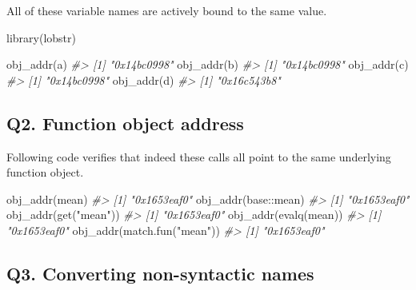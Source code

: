 \documentclass[
]{book}
\newenvironment{Shaded}{\begin{snugshade}}{\end{snugshade}}
\newcommand{\CommentTok}[1]{\textcolor[rgb]{0.56,0.35,0.01}{\textit{#1}}}
\newcommand{\FunctionTok}[1]{\textcolor[rgb]{0.00,0.00,0.00}{#1}}
\newcommand{\NormalTok}[1]{#1}
\newcommand{\SpecialCharTok}[1]{\textcolor[rgb]{0.00,0.00,0.00}{#1}}
\newcommand{\StringTok}[1]{\textcolor[rgb]{0.31,0.60,0.02}{#1}}
\begin{document}
All of these variable names are actively bound to the same value.

\begin{Shaded}
\begin{Highlighting}[]
\FunctionTok{library}\NormalTok{(lobstr)}

\FunctionTok{obj\_addr}\NormalTok{(a)}
\CommentTok{\#\textgreater{} [1] "0x14bc0998"}
\FunctionTok{obj\_addr}\NormalTok{(b)}
\CommentTok{\#\textgreater{} [1] "0x14bc0998"}
\FunctionTok{obj\_addr}\NormalTok{(c)}
\CommentTok{\#\textgreater{} [1] "0x14bc0998"}
\FunctionTok{obj\_addr}\NormalTok{(d)}
\CommentTok{\#\textgreater{} [1] "0x16c543b8"}
\end{Highlighting}
\end{Shaded}

\hypertarget{q2.-function-object-address}{%
\subsection*{Q2. Function object address}\label{q2.-function-object-address}}

Following code verifies that indeed these calls all point to the same underlying function object.

\begin{Shaded}
\begin{Highlighting}[]
\FunctionTok{obj\_addr}\NormalTok{(mean)}
\CommentTok{\#\textgreater{} [1] "0x1653eaf0"}
\FunctionTok{obj\_addr}\NormalTok{(base}\SpecialCharTok{::}\NormalTok{mean)}
\CommentTok{\#\textgreater{} [1] "0x1653eaf0"}
\FunctionTok{obj\_addr}\NormalTok{(}\FunctionTok{get}\NormalTok{(}\StringTok{"mean"}\NormalTok{))}
\CommentTok{\#\textgreater{} [1] "0x1653eaf0"}
\FunctionTok{obj\_addr}\NormalTok{(}\FunctionTok{evalq}\NormalTok{(mean))}
\CommentTok{\#\textgreater{} [1] "0x1653eaf0"}
\FunctionTok{obj\_addr}\NormalTok{(}\FunctionTok{match.fun}\NormalTok{(}\StringTok{"mean"}\NormalTok{))}
\CommentTok{\#\textgreater{} [1] "0x1653eaf0"}
\end{Highlighting}
\end{Shaded}

\hypertarget{q3.-converting-non-syntactic-names}{%
\subsection*{Q3. Converting non-syntactic names}\label{q3.-converting-non-syntactic-names}}
\end{document}
